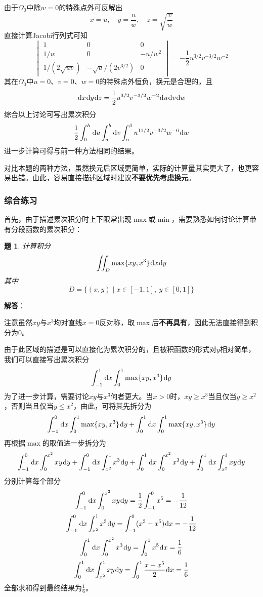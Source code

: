 \documentclass[a4paper,UTF8,fontset=windows,AutoFakeBold]{ctexart}
\newcommand*{\dr}{\hspace{0.07em}\mathrm{d}}
\newcommand*{\note}{\noindent *}
\theoremstyle{ex}
\newtheorem{exercise}{题}
\newcommand{\sol}[1]{{\vspace{5pt}\kaishu\noindent\textbf{解答}：\vspace{-3pt}
\begin{compactitem}
    \item[] #1
\end{compactitem}
}}
\begin{document}
\begin{framed}
{\begin{itemize}
        由于$\Omega_0$中除$w=0$的特殊点外可反解出
        $$x=u,\quad y=\frac{u}{w},\quad z=\sqrt{\frac{v}{w}}$$
        直接计算Jacobi行列式可知
        $$\begin{vmatrix}1&0&0\\1/w&0&-u/w^2\\1/(2\sqrt{uv})&-\sqrt{u}/(2v^{3/2})&0\end{vmatrix}=-\frac{1}{2}u^{3/2}v^{-3/2}w^{-2}$$
        其在$\Omega_0$中$u=0$、$v=0$、$w=0$的特殊点外恒负，换元是合理的，且
        $$\dr x\dr y\dr z=\frac{1}{2}u^{3/2}v^{-3/2}w^{-2}\dr u\dr v\dr w$$
        综合以上讨论可写出累次积分
        $$\frac{1}{2}\int_0^h\dr u\int_a^b\dr v\int_\alpha^\beta u^{11/2}v^{-3/2}w^{-6}\dr w$$
        进一步计算可得与前一种方法相同的结果。
    \end{itemize}

    \note 对比本题的两种方法，虽然换元后区域更简单，实际的计算量其实更大了，也更容易出错。由此，容易直接描述区域时建议\textbf{不要优先考虑换元}。
}
\end{framed}

\subsubsection{综合练习}
首先，由于描述累次积分时上下限常出现$\max$或$\min$，需要熟悉如何讨论计算带有分段函数的累次积分：
\begin{framed}
\begin{exercise}
    计算积分
    $$\iint_D\max\{xy,x^3\}\dr x\dr y$$
    其中
    $$D=\{(x,y)\mid x\in[-1,1],\ y\in[0,1]\}$$
\end{exercise}
\sol{
    \note 注意虽然$xy$与$x^3$均对直线$x=0$反对称，取$\max$后\textbf{不再具有}，因此无法直接得到积分为0。

    由于此区域的描述是可以直接化为累次积分的，且被积函数的形式对$y$相对简单，我们可以直接写出累次积分
    $$\int_{-1}^1\dr x\int_0^1\max\{xy,x^3\}\dr y$$
    为了进一步计算，需要讨论$xy$与$x^3$何者更大。当$x>0$时，$xy\ge x^3$当且仅当$y\ge x^2$，否则当且仅当$y\le x^2$，由此，可将其先拆分为
    $$\int_{-1}^0\dr x\int_0^1\max\{xy,x^3\}\dr y+\int_0^1\dr x\int_0^1\max\{xy,x^3\}\dr y$$
    再根据$\max$的取值进一步拆分为
    $$\int_{-1}^0\dr x\int_0^{x^2}xy\dr y+\int_{-1}^0\dr x\int_{x^2}^1x^3\dr y+\int_0^1\dr x\int_0^{x^2}x^3\dr y+\int_0^1\dr x\int_{x^2}^1xy\dr y$$
    分别计算每个部分
    $$\int_{-1}^0\dr x\int_0^{x^2}xy\dr y=\frac{1}{2}\int_{-1}^0x^5=-\frac{1}{12}$$
    $$\int_{-1}^0\dr x\int_{x^2}^1x^3\dr y=\int_{-1}^0(x^3-x^5)\dr x=-\frac{1}{12}$$
    $$\int_0^1\dr x\int_0^{x^2}x^3\dr y=\int_0^1x^5\dr x=\frac{1}{6}$$
    $$\int_0^1\dr x\int_{x^2}^1xy\dr y=\int_0^1\frac{x-x^5}{2}\dr x=\frac{1}{6}$$
    全部求和得到最终结果为$\frac{1}{6}$。
}
\end{framed}
\end{document}
